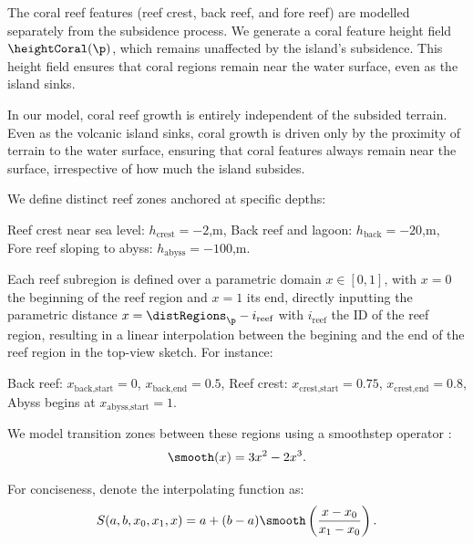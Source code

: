 The coral reef features (reef crest, back reef, and fore reef) are modelled separately from the subsidence process. We generate a coral feature height field $\heightCoral(\p)$, which remains unaffected by the island's subsidence. This height field ensures that coral regions remain near the water surface, even as the island sinks.

In our model, coral reef growth is entirely independent of the subsided terrain. Even as the volcanic island sinks, coral growth is driven only by the proximity of terrain to the water surface, ensuring that coral features always remain near the surface, irrespective of how much the island subsides.

We define distinct reef zones anchored at specific depths:
\begin{Itemize}
    \Item{} Reef crest near sea level: $h_\text{crest} = -2$,m,
    \Item{} Back reef and lagoon: $h_\text{back} = -20$,m,
    \Item{} Fore reef sloping to abyss: $h_\text{abyss} = -100$,m.
\end{Itemize}

Each reef subregion is defined over a parametric domain $x \in [0, 1]$, with $x = 0$ the beginning of the reef region and $x = 1$ its end, directly inputting the parametric distance $x = \distRegions_\p - i_{\text{reef}}$ with $i_\text{reef}$ the ID of the reef region, resulting in a linear interpolation between the begining and the end of the reef region in the top-view sketch. For instance:
\begin{Itemize}
    \Item{} Back reef: $x_{\text{back,start}} = 0$, $x_{\text{back,end}} = 0.5$,
    \Item{} Reef crest: $x_{\text{crest,start}} = 0.75$, $x_{\text{crest,end}} = 0.8$,
    \Item{} Abyss begins at $x_{\text{abyss,start}} = 1$.
\end{Itemize}

We model transition zones between these regions using a smoothstep operator \cite{Perlin2002}:
\begin{align}
    \smooth(x) = 3x^2 - 2x^3.
\end{align}

For conciseness, denote the interpolating function as:
\begin{align}
    S(a, b, x_0, x_1, x) = a + (b-a) \smooth\left(\frac{x - x_0}{x_1 - x_0}\right).
\end{align}

